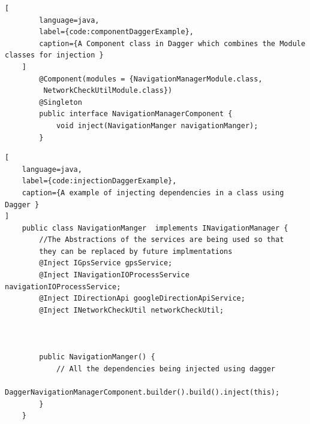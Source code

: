     \newpage
    \begin{lstlisting}[
        language=java,
        label={code:componentDaggerExample},
        caption={A Component class in Dagger which combines the Module classes for injection }
    ]
        @Component(modules = {NavigationManagerModule.class,
         NetworkCheckUtilModule.class})
        @Singleton
        public interface NavigationManagerComponent {
            void inject(NavigationManger navigationManger);
        }

\end{lstlisting}

\newpage
\begin{lstlisting}[
    language=java,
    label={code:injectionDaggerExample},
    caption={A example of injecting dependencies in a class using Dagger }
]
    public class NavigationManger  implements INavigationManager {
        //The Abstractions of the services are being used so that 
        they can be replaced by future implmentations
        @Inject IGpsService gpsService;
        @Inject INavigationIOProcessService navigationIOProcessService;
        @Inject IDirectionApi googleDirectionApiService;
        @Inject INetworkCheckUtil networkCheckUtil;



        public NavigationManger() {
            // All the dependencies being injected using dagger
            DaggerNavigationManagerComponent.builder().build().inject(this);
        }
    } 
\end{lstlisting}